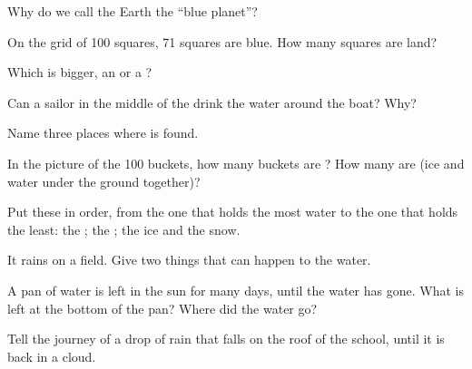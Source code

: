 \begin{exercise}[$\star$]\label{exo:g2:water-on-earth:2}
Why do we call the Earth the ``blue planet''?
\end{exercise}

\begin{exercise}[$\star$]\label{exo:g2:water-on-earth:3}
On the grid of 100 squares, 71 squares are blue. How many squares are
land?
\end{exercise}

\begin{exercise}[$\star$]\label{exo:g2:water-on-earth:4}
Which is bigger, an  or a ?
\end{exercise}

\begin{exercise}[$\star$]\label{exo:g2:water-on-earth:5}
Can a sailor in the middle of the  drink the water around the boat?
Why?
\end{exercise}

\begin{exercise}[$\star$]\label{exo:g2:water-on-earth:6}
Name three places where  is found.
\end{exercise}

\begin{exercise}[$\star\star$]\label{exo:g2:water-on-earth:7}
In the picture of the 100 buckets, how many buckets are ? How
many are  (ice and water under the ground together)?
\end{exercise}

\begin{exercise}[$\star\star$]\label{exo:g2:water-on-earth:8}
Put these in order, from the one that holds the most water to the one that
holds the least: the ; the ; the ice and the snow.
\end{exercise}

\begin{exercise}[$\star\star$]\label{exo:g2:water-on-earth:9}
It rains on a field. Give two things that can happen to the water.
\end{exercise}

\begin{exercise}[$\star\star$]\label{exo:g2:water-on-earth:10}
A pan of  water is left in the sun for many days, until the water has
gone. What is left at the bottom of the pan? Where did the water go?
\end{exercise}

\begin{exercise}[$\star\star$]\label{exo:g2:water-on-earth:11}
Tell the journey of a drop of rain that falls on the roof of the school,
until it is back in a cloud.
\end{exercise}
